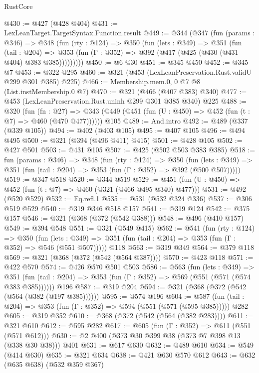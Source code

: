 \begin{lexlean}{RustCore}
\begin{coremodule}
@430 := @427 (@428 @404)
@431 := LexLeanTarget.TargetSyntax.Function.result
@449 := @344
    (@347
      (fun (params : @346) =>
      @348
        (fun (rty : @124) =>
        @350
          (fun (lets : @349) =>
          @351
            (fun (tail : @204) =>
            @353 (fun (Γ : @352) => @392 (@417 (@425 (@430 (@431 @404) @383 @385)))))))))
@450 := @6 @30
@451 := @345 @450
@452 := @345 @7
@453 := @322 @295
@460 := @321 (@453 (LexLeanPreservation.Rust.validU @299 @301 @385) @225)
@466 := Membership.mem.{0, 0} @7 @8 (List.instMembership.{0} @7)
@470 := @321 (@466 (@407 @383) @340)
@477 := @453 (LexLeanPreservation.Rust.uninh @299 @301 @385 @340) @225
@488 := @320
    (fun (fn : @27) =>
    @343 (@449 (@451 (fun (U : @450) => @452 (fun (t : @7) => @460 (@470 @477))))))
    @105
@489 := And.intro
@492 := @489 (@337 (@339 @105))
@494 := @402 (@403 @105)
@495 := @407 @105
@496 := @494 @495
@500 := @321 (@394 (@496 @411) @415)
@501 := @428 @105
@502 := @427 @501
@503 := @431 @105
@507 := @425 (@502 @503 @383 @385)
@518 := fun (params : @346) =>
  @348
    (fun (rty : @124) =>
    @350
      (fun (lets : @349) => @351 (fun (tail : @204) => @353 (fun (Γ : @352) => @392 (@500 @507)))))
@519 := @347 @518
@520 := @344 @519
@529 := @451 (fun (U : @450) => @452 (fun (t : @7) => @460 (@321 (@466 @495 @340) @477)))
@531 := @492 (@520 @529)
@532 := Eq.refl.{1}
@535 := @531 (@532 @324 @336)
@537 := @306 @519 @529
@540 := @319 @346 @518 @157
@541 := @319 @124
@542 := @375 @157
@546 := @321 (@368 (@372 (@542 @388)))
@548 := @496 (@410 @157)
@549 := @394 @548
@551 := @321 (@549 @415)
@562 := @541
    (fun (rty : @124) =>
    @350
      (fun (lets : @349) => @351 (fun (tail : @204) => @353 (fun (Γ : @352) => @546 (@551 @507)))))
    @118
@563 := @319 @349
@564 := @379 @118
@569 := @321 (@368 (@372 (@542 (@564 @387))))
@570 := @423 @118
@571 := @422 @570
@574 := @426 @570 @501 @503
@586 := @563
    (fun (lets : @349) =>
    @351 (fun (tail : @204) => @353 (fun (Γ : @352) => @569 (@551 (@571 (@574 @383 @385))))))
    @196
@587 := @319 @204
@594 := @321 (@368 (@372 (@542 (@564 (@382 (@197 @385))))))
@595 := @574 @196
@604 := @587 (fun (tail : @204) => @353 (fun (Γ : @352) => @594 (@551 (@571 (@595 @385))))) @282
@605 := @319 @352
@610 := @368 (@372 (@542 (@564 (@382 @283))))
@611 := @321 @610
@612 := @595 @282
@617 := @605 (fun (Γ : @352) => @611 (@551 (@571 @612)))
@630 := @2 @400 (@373 @30 @399 @38 (@373 @7 @398 @13 (@338 @30 @38))) @401
@631 := @617 @630
@632 := @489 @610
@634 := @549 (@414 @630)
@635 := @321 @634
@638 := @421 @630 @570 @612
@643 := @632 (@635 @638) (@532 @359 @367)

\end{coremodule}
\end{lexlean}

